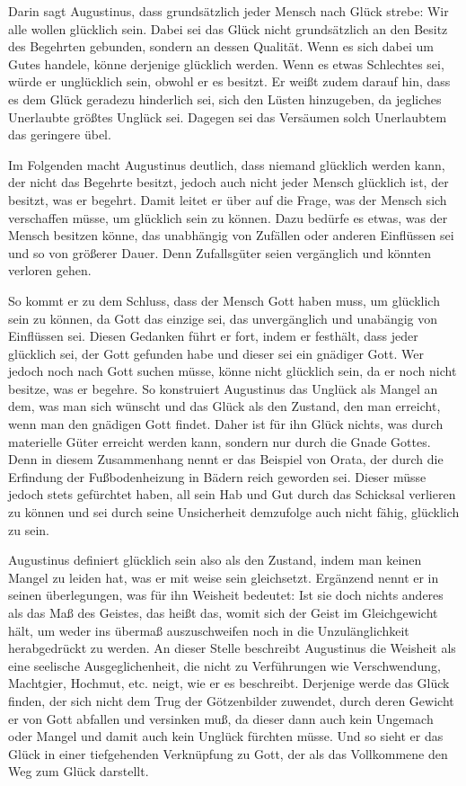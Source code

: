 Darin sagt Augustinus, dass grundsätzlich jeder Mensch nach Glück strebe: \glqq Wir alle wollen glücklich sein.\grqq{}\cite{A82, S.21}
Dabei sei das Glück nicht grundsätzlich an den Besitz des Begehrten gebunden, sondern an dessen Qualität. 
Wenn es sich dabei um Gutes handele, könne derjenige glücklich werden. 
Wenn es etwas Schlechtes sei, würde er unglücklich sein, obwohl er es besitzt. 
Er weißt zudem darauf hin, dass es dem Glück geradezu hinderlich sei, sich den Lüsten hinzugeben, da jegliches Unerlaubte größtes Unglück sei\cite{A82, S.21}.
Dagegen sei das Versäumen solch Unerlaubtem das geringere übel.

Im Folgenden macht Augustinus deutlich, dass niemand glücklich werden kann, der nicht das Begehrte besitzt, jedoch auch nicht jeder Mensch glücklich ist, der besitzt, was er begehrt. 
Damit leitet er über auf die Frage, was der Mensch sich verschaffen müsse, um glücklich sein zu können\cite{A82, S.23}.
Dazu bedürfe es etwas, was der Mensch besitzen könne, das unabhängig von Zufällen oder anderen Einflüssen sei und so von größerer Dauer. 
Denn Zufallsgüter seien vergänglich und könnten verloren gehen. 

So kommt er zu dem Schluss, dass der Mensch Gott haben muss, um glücklich sein zu können, da Gott das einzige sei, das unvergänglich und unabängig von Einflüssen sei. 
Diesen Gedanken führt er fort, indem er festhält, dass jeder glücklich sei, der Gott gefunden habe und dieser sei ein gnädiger Gott\cite{A82, S.41}. 
Wer jedoch noch nach Gott suchen müsse, könne nicht glücklich sein, da er noch nicht besitze, was er begehre. 
So konstruiert Augustinus das Unglück als Mangel an dem, was man sich wünscht und das Glück als den Zustand, den man erreicht, wenn man den gnädigen Gott findet. 
Daher ist für ihn Glück nichts, was durch materielle Güter erreicht werden kann, sondern nur durch die Gnade Gottes. 
Denn in diesem Zusammenhang nennt er das Beispiel von Orata, der durch die Erfindung der Fußbodenheizung in Bädern reich geworden sei. 
Dieser müsse jedoch stets gefürchtet haben, all sein Hab und Gut durch das Schicksal verlieren zu können und sei durch seine Unsicherheit demzufolge auch nicht fähig, glücklich zu sein\cite{A82, S.48}.

Augustinus definiert \glqq glücklich sein\grqq{} also als den Zustand, indem man keinen Mangel zu leiden hat, was er mit \glqq weise sein\grqq{} gleichsetzt. 
Ergänzend nennt er in seinen überlegungen, was für ihn Weisheit bedeutet: \glqq Ist sie doch nichts anderes als das Maß des Geistes, das heißt das, womit sich der Geist im Gleichgewicht hält, um weder ins übermaß auszuschweifen noch in die Unzulänglichkeit herabgedrückt zu werden.\grqq{}\cite{A82, S.59} 
An dieser Stelle beschreibt Augustinus die Weisheit als eine seelische Ausgeglichenheit, die nicht zu Verführungen wie Verschwendung, Machtgier, Hochmut, etc. neigt, wie er es beschreibt. 
Derjenige werde das Glück finden, der sich nicht \glqq dem Trug der Götzenbilder zuwendet, durch deren Gewicht er von Gott abfallen und versinken muß\grqq{}, da dieser dann auch kein Ungemach oder Mangel und damit auch kein Unglück fürchten müsse. 
Und so sieht er das Glück in einer tiefgehenden Verknüpfung zu Gott, der als das Vollkommene den Weg zum Glück darstellt.

